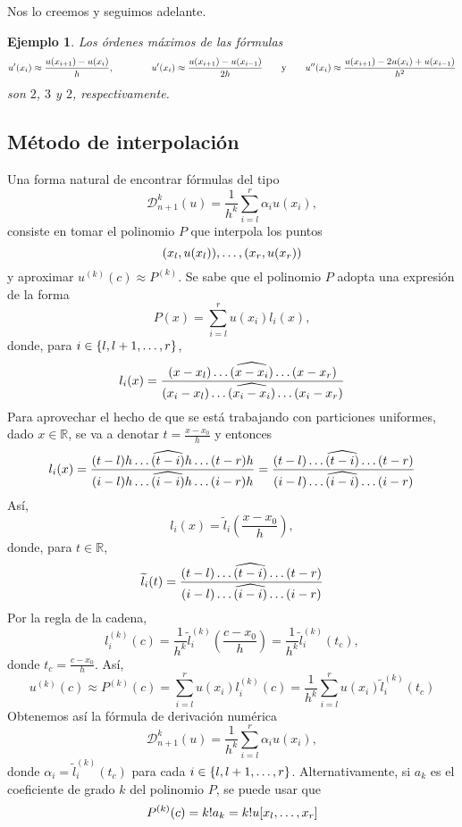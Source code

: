 \documentclass[11pt]{report}
\makeatletter
\renewenvironment{proof}[1][\proofname]{\par
  \pushQED{\qed}%
  \normalfont \topsep\z@skip %
  \trivlist
  \item[\hskip\labelsep
        \itshape
    #1\@addpunct{.}]\ignorespaces
}{%
  \popQED\endtrivlist\@endpefalse
}
\theoremstyle{mytheorem}
\theoremstyle{mydefinition}
\theoremstyle{myexample}
\newtheorem*{example}{Ejemplo}
\let\oldproofname=\proofname
\renewcommand{\proofname}{\rm\bf{\oldproofname}}}
\newcommand{\R}{\mathbb R}
\makeatother
\begin{document}
\begin{proof}
Nos lo creemos y seguimos adelante.
\end{proof}

\begin{example}
    Los órdenes máximos de las fórmulas
    \[u'(x_i) \approx \frac{u(x_{i+1})-u(x_i)}{h}, \qquad \qquad u'(x_i) \approx \frac{u(x_{i+1})-u(x_{i-1})}{2h} \qquad \textup{y} \qquad u''(x_i)\approx \frac{u(x_{i+1})-2u(x_i)+u(x_{i-1})}{h^2}\]
    son $2$, $3$ y $2$, respectivamente.
\end{example}

\subsection{Método de interpolación}

Una forma natural de encontrar fórmulas del tipo
\[\mathcal{D}_{n+1}^k(u) = \frac{1}{h^k}\sum_{i=l}^r \alpha_iu(x_i),\]
consiste en tomar el polinomio $P$ que interpola los puntos
\[(x_l,u(x_l)), \mathellipsis, (x_r,u(x_r))\]
y aproximar $u^{(k)}(c) \approx P^{(k)}$. Se sabe que el polinomio $P$ adopta una expresión de la forma
\[P(x)=\sum_{i=l}^ru(x_i)l_i(x),\]
donde, para $i \in \{l,l+1,\mathellipsis,r\}$,
\[l_i(x) = \frac{(x-x_l)\mathellipsis\widehat{(x-x_i)}\mathellipsis(x-x_r)}{(x_i-x_l)\mathellipsis\widehat{(x_i-x_i)}\mathellipsis(x_i-x_r)} \]
Para aprovechar el hecho de que se está trabajando con particiones uniformes, dado $x \in \R$, se va a denotar $t = \frac{x-x_0}{h}$ y entonces
\[l_i(x)=\frac{(t-l)h\mathellipsis\widehat{(t-i)}h\mathellipsis(t-r)h}{(i-l)h\mathellipsis\widehat{(i-i)}h\mathellipsis(i-r)h} =\frac{(t-l)\mathellipsis\widehat{(t-i)}\mathellipsis(t-r)}{(i-l)\mathellipsis\widehat{(i-i)}\mathellipsis(i-r)} \]
Así,
\[l_i(x)=\widetilde{l}_i\left(\frac{x-x_0}{h}\right),\]
donde, para $t \in \R$,
\[\widetilde{l}_i(t)=\frac{(t-l)\mathellipsis\widehat{(t-i)}\mathellipsis(t-r)}{(i-l)\mathellipsis\widehat{(i-i)}\mathellipsis(i-r)}\]
Por la regla de la cadena,
\[l_i^{(k)}(c)=\frac{1}{h^k}\widetilde{l}_i^{(k)}\left(\frac{c-x_0}{h}\right) = \frac{1}{h^k}\widetilde{l}_i^{(k)}(t_c),\]
donde $t_c = \frac{c-x_0}{h}$. Así,
\[u^{(k)}(c)\approx P^{(k)}(c)=\sum_{i=l}^r u(x_i)l_i^{(k)}(c) = \frac{1}{h^k} \sum_{i=l}^r u(x_i)\widetilde{l}_i^{(k)}(t_c)\]
Obtenemos así la fórmula de derivación numérica
\[\mathcal{D}_{n+1}^k(u) = \frac{1}{h^k}\sum_{i=l}^r \alpha_iu(x_i),\]
donde $\alpha_i=\widetilde{l}_i^{(k)}(t_c)$ para cada $ i \in \{l,l+1,\mathellipsis,r\}$. Alternativamente, si $a_k$ es el coeficiente de grado $k$ del polinomio $P$, se puede usar que \[P^{(k)}(c)=k!a_k = k!u[x_l,\mathellipsis,x_r]\]
\end{document}
